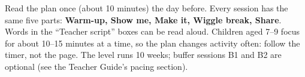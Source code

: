 \documentclass[track=junior,level=3,teacher]{kidscode}
\begin{document}

\begin{tip}
Read the plan once (about 10 minutes) the day before. Every session has the same five parts:
\textbf{Warm-up, Show me, Make it, Wiggle break, Share}. Words in the \enquote{Teacher script}
boxes can be read aloud. Children aged 7--9 focus for about 10--15 minutes at a time, so the plan
changes activity often: follow the timer, not the page. The level runs 10 weeks; buffer
sessions B1 and B2 are optional (see the Teacher Guide's pacing section).
\end{tip}
\kcweeklytoc
{}
\end{document}
